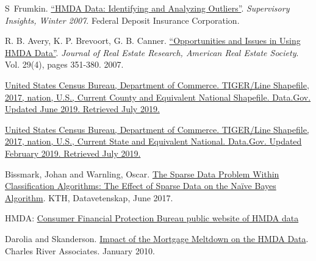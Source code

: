 \documentclass[conference,compsoc]{IEEEtran}
\begin{document}
%
%
%
\begin{thebibliography}{1}

S~Frumkin. \href{https://www.fdic.gov/regulations/examinations/supervisory/insights/siwin07/siwinter07-article4.pdf}{``HMDA Data: Identifying and Analyzing Outliers''}. \textit{Supervisory Insights, Winter 2007}.  Federal Deposit Insurance Corporation. 


R. B. Avery, K. P. Brevoort, G. B. Canner. \href{https://ideas.repec.org/a/jre/issued/v29n42007p351-380.html
}{``Opportunities and Issues in Using HMDA Data''}. \textit{Journal of Real Estate Research, American Real Estate Society}. Vol. 29(4), pages 351-380. 2007.

\href{ https://catalog.data.gov/dataset/tiger-line-shapefile-2017-nation-u-s-current-county-and-equivalent-national-shapefile}{United States Census Bureau, Department of Commerce. TIGER/Line Shapefile, 2017, nation, U.S., Current County and Equivalent National Shapefile. Data.Gov. Updated June 2019. Retrieved July 2019.}

\href{https://catalog.data.gov/dataset/tiger-line-shapefile-2017-nation-u-s-current-state-and-equivalent-national  }{United States Census Bureau, Department of Commerce. TIGER/Line Shapefile, 2017, nation, U.S., Current State and Equivalent National. Data.Gov. Updated February 2019. Retrieved July 2019. }


Bissmark, Johan and Warnling, Oscar. \href{http://www.diva-portal.se/smash/get/diva2:1111045/FULLTEXT01.pdf}{The Sparse Data Problem Within Classification Algorithms: The Effect of Sparse Data on the Naïve Bayes Algorithm}. KTH, Datavetenskap, June 2017.


HMDA: \href{https://www.consumerfinance.gov/data-research/hmda/historic-data/}{Consumer Financial Protection Bureau public website of HMDA data}


Darolia and Skanderson.  \href{https://www.crai.com/sites/default/files/publications/impact-of-the-mortgage-meltdown-on-the-hmda-data.pdf}{Impact of the Mortgage Meltdown on the HMDA Data}. Charles River Associates. January 2010.


\end{thebibliography}




\end{document}
